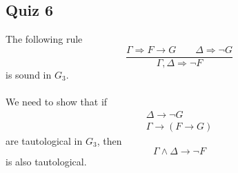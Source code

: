 \subsection{Quiz 6}
The following rule 
\begin{equation*}
\frac{\Gamma \Rightarrow F \rightarrow G \qquad \Delta \Rightarrow \neg G}{\Gamma, \Delta \Rightarrow \neg F}
\end{equation*}
is sound in $G_3$. \\\\
\noindent
We need to show that if 
\begin{eqnarray}
\label{delta}
\Delta \rightarrow \neg G \\
\label{gamma}
\Gamma \rightarrow (F \rightarrow G)
\end{eqnarray}
are tautological in $G_3$, then
\begin{equation}
\Gamma \wedge \Delta \rightarrow \neg F
\end{equation}
is also tautological. 


